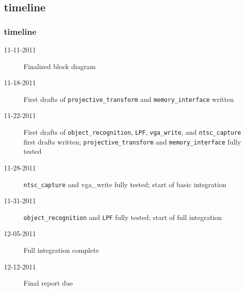 \documentclass{beamer}
\begin{document}
\subsection{timeline}
\begin{frame}
	\frametitle{timeline}
	\begin{description}
	\item[11-11-2011] Finalized block diagram
	\item[11-18-2011] First drafts of {\tt projective\_transform} and {\tt memory\_interface} written
	\item[11-22-2011] First drafts of {\tt object\_recognition}, {\tt LPF}, {\tt vga\_write}, and {\tt ntsc\_capture} first drafts written; {\tt projective\_transform} and {\tt memory\_interface} fully tested
	\item[11-28-2011] {\tt ntsc\_capture} and {vga\_write} fully tested; start of basic integration
	\item[11-31-2011] {\tt object\_recognition} and {\tt LPF} fully tested; start of full integration
	\item[12-05-2011] Full integration complete
	\item[12-12-2011] Final report due
	\end{description}
\end{frame}
\end{document}
